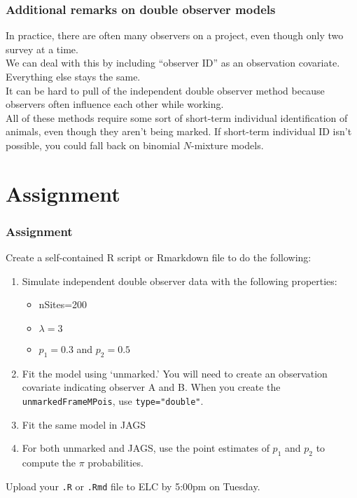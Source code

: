 \documentclass[color=usenames,dvipsnames]{beamer}\usepackage[]{graphicx}\usepackage[]{xcolor}
\newcommand{\inr}[1]{\colorbox{inlinecolor}{\texttt{#1}}}
\begin{document}






\begin{frame}
  \frametitle{Additional remarks on double observer models}
  In practice, there are often many observers on a project, even
  though only two survey at a time. \\
  \pause
  \vfill
  We can deal with this by including ``observer ID'' as an observation
  covariate. Everything else stays the same. \\
  \pause
  \vfill
  It can be hard to pull of the independent double observer method
  because observers often influence each other while working. \\
  \pause
  \vfill
  All of these methods require some sort of \alert{short-term}
  individual identification of animals, even though they aren't being
  marked.
  \pause
  \vfill
  If short-term individual ID isn't possible, you could fall
  back on binomial $N$-mixture models.
\end{frame}




\section{Assignment}




\begin{frame}[fragile]
  \frametitle{Assignment}
  \small
  Create a self-contained R script or Rmarkdown file
  to do the following:
  \vfill
  \begin{enumerate}
    \small
    \item Simulate \alert{independent} double observer data with the following
      properties:
      \begin{itemize}
        \item nSites=200
        \item $\lambda=3$
        \item $p_1=0.3$ and $p_2=0.5$
      \end{itemize}
    \item Fit the model using `unmarked.' You will need to create an
      observation covariate indicating observer A and B. When you
      create the \inr{unmarkedFrameMPois}, use \inr{type="double"}.
    \item Fit the same model in JAGS
    \item For both unmarked and JAGS, use the point estimates of $p_1$
      and $p_2$ to compute the $\pi$ probabilities.  
  \end{enumerate}
  \vfill
  Upload your {\tt .R} or {\tt .Rmd} file to ELC by 5:00pm on Tuesday.
\end{frame}
\end{document}
